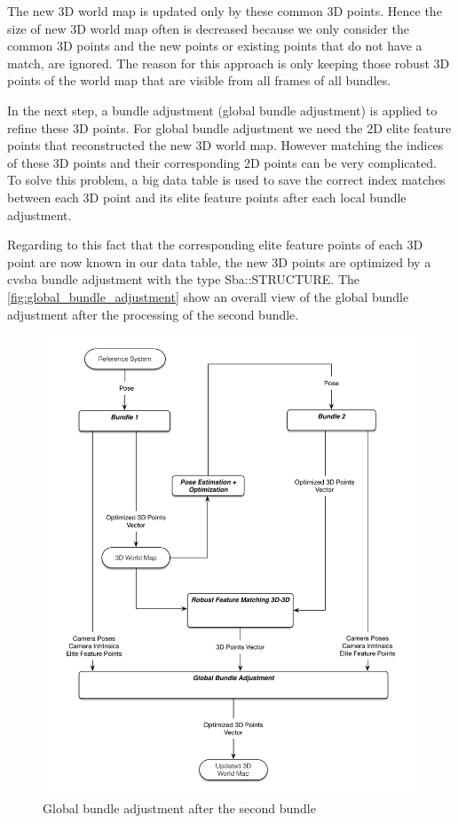 The new 3D world map is updated only by these common 3D points. Hence the size of new 3D world map often is decreased because we only consider the common 3D points and the new points or existing points that do not have a match, are ignored. The reason for this approach is only keeping those robust 3D points of the world map that are visible from all frames of all bundles. 

In the next step, a bundle adjustment (global bundle adjustment) is applied to refine these 3D points. For global bundle adjustment we need the 2D elite feature points that reconstructed the new 3D world map. However matching the indices of these 3D points and their corresponding 2D points can be very complicated. To solve this problem, a big data table is used to save the correct index matches between each 3D point and its elite feature points after each local bundle adjustment.

Regarding to this fact that the corresponding elite feature points of each 3D point are now known in our data table, the new 3D points are optimized by a cvsba bundle adjustment with the type Sba::STRUCTURE. The \autoref{fig:global_bundle_adjustment} show an overall view of the global bundle adjustment after the processing of the second bundle.

\begin{figure}[H]
  \centering
  \includegraphics[width=120mm]{figures/global_bundle_adjustment}
  \caption{Global bundle adjustment after the second bundle}\label{fig:global_bundle_adjustment}
\end{figure}


